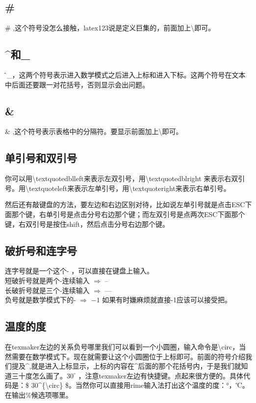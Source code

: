 \subsection{\#}
\# ,这个符号没怎么接触，latex123说是定义巨集的，前面加上\textbackslash 即可。

\subsection{\^{}和\_{}}
\^和\_{}，这两个符号表示进入数学模式之后进入上标和进入下标。这两个符号在文本中后面还要跟一对花括号，否则显示会出问题。

\subsection{\&}
\& ,这个符号表示表格中的分隔符。要显示前面加上\textbackslash 即可。

\subsection{单引号和双引号}
你可以用\textbackslash textquotedblleft来表示左双引号，用\textbackslash textquotedblright 来表示右双引号。用\textbackslash textquoteleft来表示左单引号，用\textbackslash textquoteright来表示右单引号。

然后还有敲键盘的方法，要左边和右边区别对待，比如说左单引号就是点击ESC下面那个键，右单引号是点击分号右边那个键；而左双引号是点两次ESC下面那个键，右双引号是按住shift，然后点击分号右边那个键。

\subsection{破折号和连字号}
连字号就是一个这个- ，可以直接在键盘上输入。\\
短破折号就是两个-连续输入 $ \Longrightarrow $  --\\
长破折号就是三个-连续输入 $ \Longrightarrow $  ---\\
负号就是数学模式下的-  $ \Longrightarrow $ $ -1 $  如果有时嫌麻烦就直接-1应该可以接受把。

\subsection{温度的度}
在texmaker左边的关系负号哪里我们可以看到一个小圆圈，输入命令是\textbackslash circ，当然需要在数学模式下。现在就需要让这个小圆圈位于上标即可。前面的符号介绍我们提及\^{},就是进入上标显示，上标的内容在\^{}后面的那个花括号内，于是我们就知道三十度怎么画了。$ 30^{\circ} $ ，注意texmaker左边有快捷键。点起来很方便的。具体代码是：\$ 30\^{}\{\textbackslash circ\} \$。当然你可以直接用rime输入法打出这个温度的度：°，℃。在输出\%候选项哪里。

